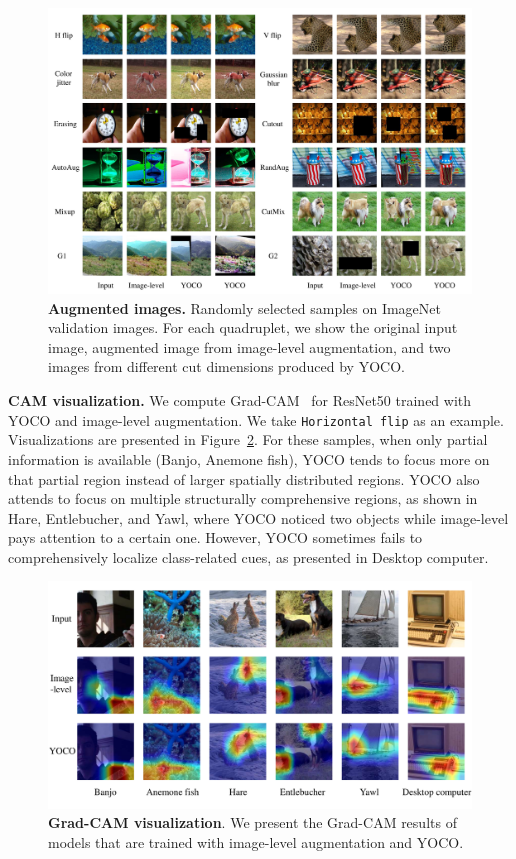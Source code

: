 \documentclass{article}
\begin{document}
\begin{figure}[!htb]
     \centering
     \includegraphics[width = 17cm]
     {figures/visu.pdf}
     \caption{\textbf{Augmented images.} Randomly selected samples on ImageNet validation images. For each quadruplet, we show the original input image, augmented image from image-level augmentation, and two images from different cut dimensions produced by YOCO.  }
     \label{fig:visu}
\end{figure}


\textbf{CAM visualization.} We compute Grad-CAM~\cite{selvaraju2017grad} for ResNet50 trained with YOCO and image-level augmentation. We take \texttt{Horizontal flip} as an example. Visualizations are presented in Figure~\ref{fig:grad}. For these samples, when only partial information is available (Banjo, Anemone fish), YOCO tends to focus more on that partial region instead of larger spatially distributed regions. YOCO also attends to focus on multiple structurally comprehensive regions, as shown in Hare,  Entlebucher, and Yawl, where YOCO noticed two objects while image-level pays attention to a certain one. However, YOCO sometimes fails to comprehensively localize class-related cues, as presented in Desktop computer. 

\begin{figure}[!htb]
     \centering
     \includegraphics[width = 17cm]
     {figures/cam.pdf}
     \caption{\textbf{Grad-CAM visualization}. We present the Grad-CAM results of models that are trained with image-level augmentation and YOCO. }
     \label{fig:grad}
\end{figure}
\end{document}
